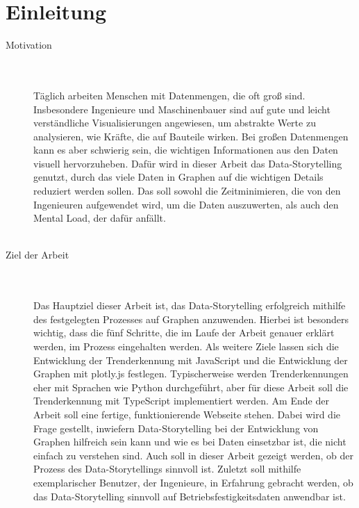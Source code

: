 \chapter{Einleitung}
\begin{description}
\item[Motivation] \hfill \\\\
Täglich arbeiten Menschen mit Datenmengen, die oft groß sind. Insbesondere Ingenieure und Maschinenbauer sind auf gute und leicht verständliche Visualisierungen angewiesen, um abstrakte Werte zu analysieren, wie Kräfte, die auf Bauteile wirken. Bei großen Datenmengen kann es aber schwierig sein, die wichtigen Informationen aus den Daten visuell hervorzuheben. Dafür wird in dieser Arbeit das Data-Storytelling genutzt, durch das viele Daten in Graphen auf die wichtigen Details reduziert werden sollen. Das soll sowohl die Zeitminimieren, die von den Ingenieuren aufgewendet wird, um die Daten auszuwerten, als auch den Mental Load, der dafür anfällt.\\\\

\item[Ziel der Arbeit]\hfill \\\\
Das Hauptziel dieser Arbeit ist, das Data-Storytelling erfolgreich mithilfe des festgelegten Prozesses auf Graphen anzuwenden. Hierbei ist besonders wichtig, dass die fünf Schritte, die im Laufe der Arbeit genauer erklärt werden, im Prozess eingehalten werden. Als weitere Ziele lassen sich die Entwicklung der Trenderkennung mit JavaScript und die Entwicklung der Graphen mit plotly.js festlegen. Typischerweise werden Trenderkennungen eher mit Sprachen wie Python durchgeführt, aber für diese Arbeit soll die Trenderkennung mit TypeScript implementiert werden. Am Ende der Arbeit soll eine fertige, funktionierende Webseite stehen. Dabei wird die Frage gestellt, inwiefern Data-Storytelling bei der Entwicklung von Graphen hilfreich sein kann und wie es bei Daten einsetzbar ist, die nicht einfach zu verstehen sind. Auch soll in dieser Arbeit gezeigt werden, ob der Prozess des Data-Storytellings sinnvoll ist. Zuletzt soll mithilfe exemplarischer Benutzer, der Ingenieure, in Erfahrung gebracht werden, ob das Data-Storytelling sinnvoll auf Betriebsfestigkeitsdaten anwendbar ist.\\\\


\end{description}
